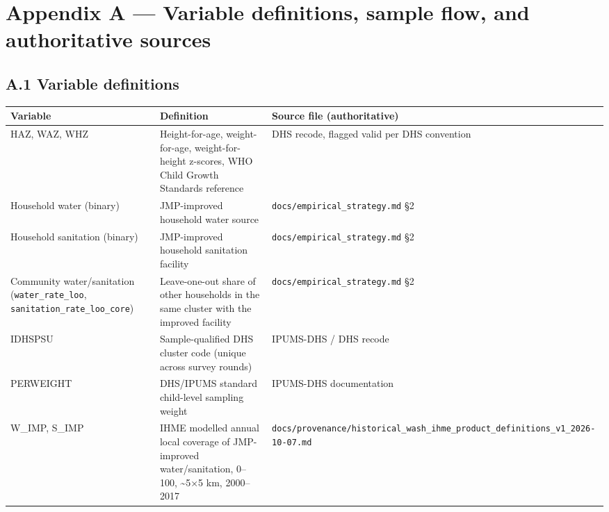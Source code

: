 \section*{Appendix A --- Variable definitions, sample flow, and authoritative sources}

\subsection*{A.1 Variable definitions}

\begingroup\fontsize{10}{15}\selectfont\setlength{\tabcolsep}{3pt}
\begin{longtable}{>{\raggedright\arraybackslash}p{2.65cm}>{\raggedright\arraybackslash}p{6.27cm}>{\raggedright\arraybackslash}p{4.92cm}}
\toprule
Variable & Definition & Source file (authoritative) \\
\midrule
\endhead
HAZ, WAZ, WHZ & Height-for-age, weight-for-age, weight-for-height z-scores, WHO Child Growth Standards reference \parencite{deOnis2006} & DHS recode, flagged valid per DHS convention \\
Household water (binary) & JMP-improved household water source & \texttt{docs/\allowbreak{}empirical\_\allowbreak{}strategy.\allowbreak{}md} §2 \\
Household sanitation (binary) & JMP-improved household sanitation facility & \texttt{docs/\allowbreak{}empirical\_\allowbreak{}strategy.\allowbreak{}md} §2 \\
Community water/sanitation (\texttt{water\_\allowbreak{}rate\_\allowbreak{}loo}, \texttt{sanitation\_\allowbreak{}rate\_\allowbreak{}loo\_\allowbreak{}core}) & Leave-one-out share of other households in the same cluster with the improved facility & \texttt{docs/\allowbreak{}empirical\_\allowbreak{}strategy.\allowbreak{}md} §2 \\
IDHSPSU & Sample-qualified DHS cluster code (unique across survey rounds) & IPUMS-DHS / DHS recode \\
PERWEIGHT & DHS/IPUMS standard child-level sampling weight & IPUMS-DHS documentation \\
W\_IMP, S\_IMP & IHME modelled annual local coverage of JMP-improved water/sanitation, 0--100, \textasciitilde{}5×5 km, 2000--2017 & \texttt{docs/\allowbreak{}provenance/\allowbreak{}historical\_\allowbreak{}wash\_\allowbreak{}ihme\_\allowbreak{}product\_\allowbreak{}definitions\_\allowbreak{}v1\_\allowbreak{}2026-\allowbreak{}10-\allowbreak{}07.\allowbreak{}md} \\

\end{longtable}
